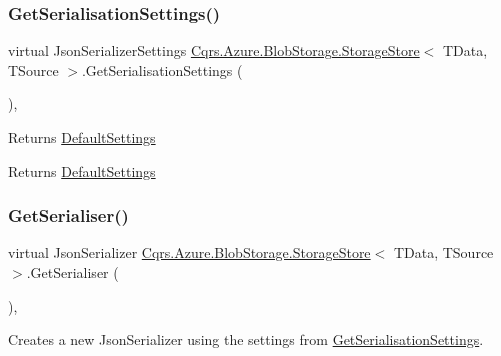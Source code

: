 \subsubsection{\texorpdfstring{Get\+Serialisation\+Settings()}{GetSerialisationSettings()}}
{\footnotesize\ttfamily virtual Json\+Serializer\+Settings \hyperlink{classCqrs_1_1Azure_1_1BlobStorage_1_1StorageStore}{Cqrs.\+Azure.\+Blob\+Storage.\+Storage\+Store}$<$ T\+Data, T\+Source $>$.Get\+Serialisation\+Settings (\begin{DoxyParamCaption}{ }\end{DoxyParamCaption})\hspace{0.3cm}{\ttfamily [protected]}, {\ttfamily [virtual]}}



Returns \hyperlink{classCqrs_1_1Azure_1_1BlobStorage_1_1StorageStore_ac5c27123fd0bf4d926a4865e2d6b0bdd_ac5c27123fd0bf4d926a4865e2d6b0bdd}{Default\+Settings} 

\begin{DoxyReturn}{Returns}
\hyperlink{classCqrs_1_1Azure_1_1BlobStorage_1_1StorageStore_ac5c27123fd0bf4d926a4865e2d6b0bdd_ac5c27123fd0bf4d926a4865e2d6b0bdd}{Default\+Settings}
\end{DoxyReturn}
\mbox{\label{classCqrs_1_1Azure_1_1BlobStorage_1_1StorageStore_acca953271229a19433db9c38c85b5b9e_acca953271229a19433db9c38c85b5b9e}} 
\subsubsection{\texorpdfstring{Get\+Serialiser()}{GetSerialiser()}}
{\footnotesize\ttfamily virtual Json\+Serializer \hyperlink{classCqrs_1_1Azure_1_1BlobStorage_1_1StorageStore}{Cqrs.\+Azure.\+Blob\+Storage.\+Storage\+Store}$<$ T\+Data, T\+Source $>$.Get\+Serialiser (\begin{DoxyParamCaption}{ }\end{DoxyParamCaption})\hspace{0.3cm}{\ttfamily [protected]}, {\ttfamily [virtual]}}



Creates a new Json\+Serializer using the settings from \hyperlink{classCqrs_1_1Azure_1_1BlobStorage_1_1StorageStore_a9ded88f1b48cf61b3be826fb0997adfb_a9ded88f1b48cf61b3be826fb0997adfb}{Get\+Serialisation\+Settings}. 

